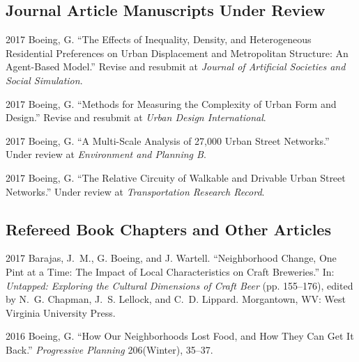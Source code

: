 \documentclass{academiccv}
\begin{document}
\subsection*{Journal Article Manuscripts Under Review}

\begin{tablist}

\item[2017] \tab Boeing, G. \enquote{The Effects of Inequality, Density, and Heterogeneous Residential Preferences on Urban Displacement and Metropolitan Structure: An Agent-Based Model.} Revise and resubmit at \emph{Journal of Artificial Societies and Social Simulation}.

\item[2017] \tab Boeing, G. \enquote{Methods for Measuring the Complexity of Urban Form and Design.} Revise and resubmit at \emph{Urban Design International}.

\item[2017] \tab Boeing, G. \enquote{A Multi-Scale Analysis of 27,000 Urban Street Networks.} Under review at \emph{Environment and Planning B}.

\item[2017] \tab Boeing, G. \enquote{The Relative Circuity of Walkable and Drivable Urban Street Networks.} Under review at \emph{Transportation Research Record}.

\end{tablist}



\subsection*{Refereed Book Chapters and Other Articles}

\begin{tablist}

\item[2017] \tab Barajas, J.~M., G. Boeing, and J. Wartell. \enquote{Neighborhood Change, One Pint at a Time: The Impact of Local Characteristics on Craft Breweries.} In: \emph{Untapped: Exploring the Cultural Dimensions of Craft Beer} (pp. 155--176), edited by N.~G. Chapman, J.~S. Lellock, and C.~D. Lippard. Morgantown, WV: West Virginia University Press.

\item[2016] \tab Boeing, G. \enquote{How Our Neighborhoods Lost Food, and How They Can Get It Back.} \emph{Progressive Planning} 206(Winter), 35--37.

\end{tablist}
\end{document}
